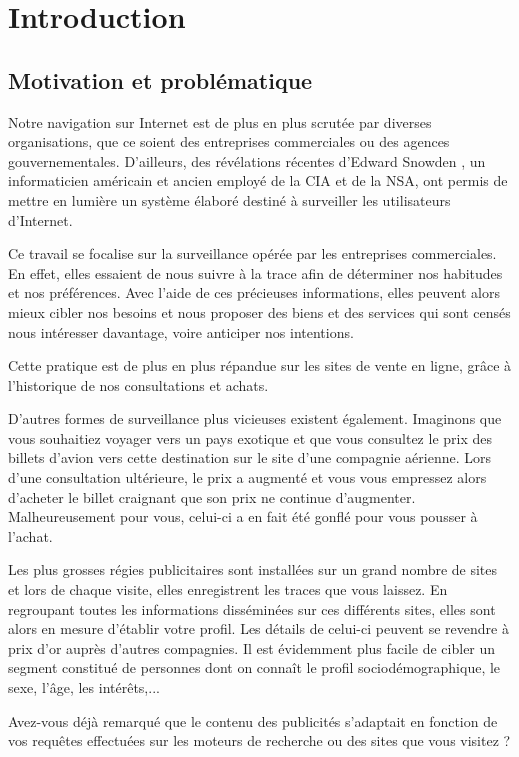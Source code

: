 \chapter{Introduction}
\section{Motivation et problématique}
Notre navigation sur Internet est de plus en plus scrutée par diverses organisations, que ce soient des entreprises commerciales ou des agences gouvernementales. D'ailleurs, des révélations récentes d'Edward Snowden \cite{WikipediaFR_RES}, un informaticien américain et ancien employé de la CIA et de la NSA, ont permis de mettre en lumière un système élaboré destiné à surveiller les utilisateurs d'Internet.

Ce travail se focalise sur la surveillance opérée par les entreprises commerciales. En effet, elles essaient de nous suivre à la trace afin de déterminer nos habitudes et nos préférences. Avec l'aide de ces précieuses informations, elles peuvent alors mieux cibler nos besoins et nous proposer des biens et des services qui sont censés nous intéresser davantage, voire anticiper nos intentions\cite{MD1}.

Cette pratique est de plus en plus répandue sur les sites de vente en ligne, grâce à l'historique de nos consultations et achats.

D'autres formes de surveillance plus vicieuses existent également. Imaginons que vous souhaitiez voyager vers un pays exotique et que vous consultez le prix des billets d'avion vers cette destination sur le site d'une compagnie aérienne. Lors d'une consultation ultérieure, le prix a augmenté et vous vous empressez alors d'acheter le billet craignant que son prix ne continue d'augmenter. Malheureusement pour vous, celui-ci a en fait été gonflé pour vous pousser à l'achat.

Les plus grosses régies publicitaires sont installées sur un grand nombre de sites et lors de chaque visite, elles enregistrent les traces que vous laissez. En regroupant toutes les informations disséminées sur ces différents sites, elles sont alors en mesure d'établir votre profil. Les détails de celui-ci peuvent se revendre à prix d'or auprès d'autres compagnies. Il est évidemment plus facile de cibler un segment constitué de personnes dont on connaît le profil sociodémographique, le sexe, l'âge, les intérêts,...

Avez-vous déjà remarqué que le contenu des publicités s'adaptait en fonction de vos requêtes effectuées sur les moteurs de recherche ou des sites que vous visitez ?

